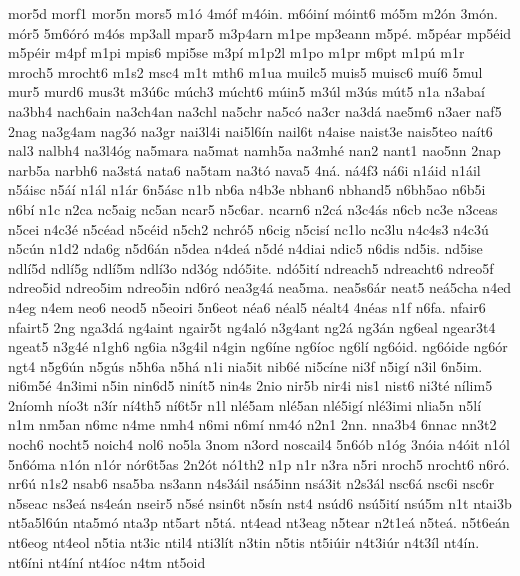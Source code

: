 {mor5d
morf1
mor5n
mors5
m1^^f3
4m^^f3f
m4^^f3in.
m6^^f3in^^ed
m^^f3int6
m^^f35m
m2^^f3n
3m^^f3n.
m^^f3r5
5m6^^f3r^^f3
m4^^f3s
mp3all
mpar5
m3p4arn
m1pe
mp3eann
m5p^^e9.
m5p^^e9ar
mp5^^e9id
m5p^^e9ir
m4pf
m1pi
mpis6
mpi5se
m3p^^ed
m1p2l
m1po
m1pr
m6pt
m1p^^fa
m1r
mroch5
mrocht6
m1s2
msc4
m1t
mth6
m1ua
muilc5
muis5
muisc6
mu^^ed6
5mul
mur5
murd6
mus3t
m3^^fa6c
m^^fach3
m^^facht6
m^^fain5
m3^^fal
m3^^fas
m^^fat5
n1a
n3aba^^ed
na3bh4
nach6ain
na3ch4an
na3chl
na5chr
na5c^^f3
na3cr
na3d^^e1
nae5m6
n3aer
naf5
2nag
na3g4am
nag3^^f3
na3gr
nai3l4i
nai5l6^^edn
nail6t
n4aise
naist3e
nais5teo
na^^edt6
nal3
nalbh4
na3l4^^f3g
na5mara
na5mat
namh5a
na3mh^^e9
nan2
nant1
nao5nn
2nap
narb5a
narbh6
na3st^^e1
nata6
na5tam
na3t^^f3
nava5
4n^^e1.
n^^e14f3
n^^e16i
n1^^e1id
n1^^e1il
n5^^e1isc
n5^^e1^^ed
n1^^e1l
n1^^e1r
6n5^^e1sc
n1b
nb6a
n4b3e
nbhan6
nbhand5
n6bh5ao
n6b5i
n6b^^ed
n1c
n2ca
nc5aig
nc5an
ncar5
n5c6ar.
ncarn6
n2c^^e1
n3c4^^e1s
n6cb
nc3e
n3ceas
n5cei
n4c3^^e9
n5c^^e9ad
n5c^^e9id
n5ch2
nchr^^f35
n6cig
n5cis^^ed
nc1lo
nc3lu
n4c4s3
n4c3^^fa
n5c^^fan
n1d2
nda6g
n5d6^^e1n
n5dea
n4de^^e1
n5d^^e9
n4diai
ndic5
n6dis
nd5is.
nd5ise
ndl^^ed5d
ndl^^ed5g
ndl^^ed5m
ndl^^ed3o
nd3^^f3g
nd^^f35ite.
nd^^f35it^^ed
ndreach5
ndreacht6
ndreo5f
ndreo5id
ndreo5im
ndreo5in
nd6r^^f3
nea3g4^^e1
nea5ma.
nea5s6^^e1r
neat5
ne^^e15cha
n4ed
n4eg
n4em
neo6
neod5
n5eoiri
5n6eot
n^^e9a6
n^^e9al5
n^^e9alt4
4n^^e9as
n1f
n6fa.
nfair6
nfairt5
2ng
nga3d^^e1
ng4aint
ngair5t
ng4al^^f3
n3g4ant
ng2^^e1
ng3^^e1n
ng6eal
ngear3t4
ngeat5
n3g4^^e9
n1gh6
ng6ia
n3g4il
n4gin
ng6^^edne
ng6^^edoc
ng6l^^ed
ng6^^f3id.
ng6^^f3ide
ng6^^f3r
ngt4
n5g6^^fan
n5g^^fas
n5h6a
n5h^^e1
n1i
nia5it
nib6^^e9
ni5c^^edne
ni3f
n5ig^^ed
n3il
6n5im.
ni6m5^^e9
4n3imi
n5in
nin6d5
nin^^edt5
nin4s
2nio
nir5b
nir4i
nis1
nist6
ni3t^^e9
n^^edlim5
2n^^edomh
n^^edo3t
n3^^edr
n^^ed4th5
n^^ed6t5r
n1l
nl^^e95am
nl^^e95an
nl^^e95ig^^ed
nl^^e93imi
nlia5n
n5l^^ed
n1m
nm5an
n6mc
n4me
nmh4
n6mi
n6m^^ed
nm4^^f3
n2n1
2nn.
nna3b4
6nnac
nn3t2
noch6
nocht5
noich4
nol6
no5la
3nom
n3ord
noscail4
5n6^^f3b
n1^^f3g
3n^^f3ia
n4^^f3it
n1^^f3l
5n6^^f3ma
n1^^f3n
n1^^f3r
n^^f3r6t5as
2n2^^f3t
n^^f31th2
n1p
n1r
n3ra
n5ri
nroch5
nrocht6
n6r^^f3.
nr6^^fa
n1s2
nsab6
nsa5ba
ns3ann
n4s3^^e1il
ns^^e15inn
ns^^e13it
n2s3^^e1l
nsc6^^e1
nsc6i
nsc6r
n5seac
ns3e^^e1
ns4e^^e1n
nseir5
n5s^^e9
nsin6t
n5s^^edn
nst4
ns^^fad6
ns^^fa5it^^ed
ns^^fa5m
n1t
ntai3b
nt5a5l6^^fan
nta5m^^f3
nta3p
nt5art
n5t^^e1.
nt4ead
nt3eag
n5tear
n2t1e^^e1
n5te^^e1.
n5t6e^^e1n
nt6eog
nt4eol
n5tia
nt3ic
ntil4
nti3l^^edt
n3tin
n5tis
nt5i^^fair
n4t3i^^far
n4t3^^edl
nt4^^edn.
nt6^^edni
nt4^^edn^^ed
nt4^^edoc
n4tm
nt5oid
}
